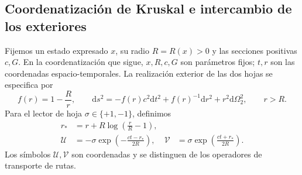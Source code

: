 \subsection{Coordenatización de Kruskal e intercambio de los exteriores}
\label{vii:subsec:kruskal-dos-hojas}

Fijemos un estado expresado \(x\), su radio \(R=R(x)>0\) y las
secciones positivas \(c,G\). En la coordenatización que sigue, \(x,R,c,G\)
son parámetros fijos; \(t,r\) son las coordenadas espacio-temporales.
La realización exterior de las dos hojas se especifica por
\begin{equation}
 f(r)=1-\frac Rr,\qquad
 \mathrm ds^2=-f(r)c^2\mathrm dt^2+f(r)^{-1}\mathrm dr^2
                 +r^2\mathrm d\Omega_2^2,\qquad r>R.
 \label{vii:eq:metrica-exterior}
\end{equation}
Para el lector de hoja \(\sigma\in\{+1,-1\}\), definimos
\begin{align}
 r_*&=r+R\log\left(\frac rR-1\right),\\
 \mathcal U&=-\sigma\exp\left(-\frac{ct-r_*}{2R}\right),&
 \mathcal V&=\sigma\exp\left(\frac{ct+r_*}{2R}\right).
 \label{vii:eq:carta-kruskal}
\end{align}
Los símbolos \(\mathcal U,\mathcal V\) son coordenadas y se
distinguen de los operadores de transporte de rutas.

